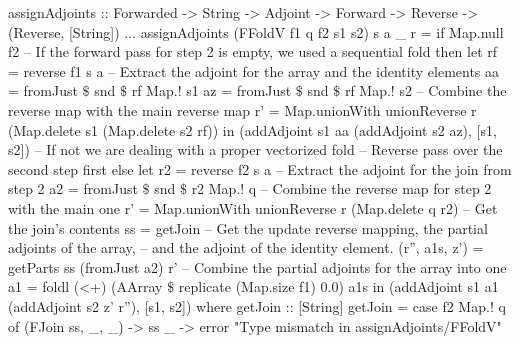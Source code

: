             \begin{haskell}[caption=Reverse pass over a vectorized fold, label=lst:assign_foldv, gobble=16]
                assignAdjoints :: Forwarded -> String -> Adjoint -> Forward -> Reverse
                    -> (Reverse, [String])
                $\dots$
                assignAdjoints (FFoldV f1 q f2 s1 s2) s a _ r =
                    if   Map.null f2
                    -- If the forward pass for step 2 is empty, we used a sequential fold
                    then let rf = reverse f1 s a
                             -- Extract the adjoint for the array and the identity elements
                             aa = fromJust $\$$ snd $\$$ rf Map.! s1
                             az = fromJust $\$$ snd $\$$ rf Map.! s2
                             -- Combine the reverse map with the main reverse map
                             r' = Map.unionWith unionReverse r 
                                (Map.delete s1 (Map.delete s2 rf))
                         in  (addAdjoint s1 aa (addAdjoint s2 az), [s1, s2])
                    -- If not we are dealing with a proper vectorized fold
                             -- Reverse pass over the second step first
                    else let r2 = reverse f2 s a
                             -- Extract the adjoint for the join from step 2
                             a2 = fromJust $\$$ snd $\$$ r2 Map.! q
                             -- Combine the reverse map for step 2 with the main one
                             r' = Map.unionWith unionReverse r (Map.delete q r2)
                             -- Get the join's contents
                             ss = getJoin
                             -- Get the update reverse mapping, the partial adjoints of the array,
                             -- and the adjoint of the identity element.
                             (r'', a1s, z') = getParts ss (fromJust a2) r'
                             -- Combine the partial adjoints for the array into one
                             a1 = foldl (<+) (AArray $\$$ replicate (Map.size f1) 0.0) a1s
                         in  (addAdjoint s1 a1 (addAdjoint s2 z' r''), [s1, s2])
                    where
                        getJoin :: [String]
                        getJoin = case f2 Map.! q of
                            (FJoin ss, _, _) -> ss
                            _                -> error "Type mismatch in assignAdjoints/FFoldV"
                        

\end{haskell}
